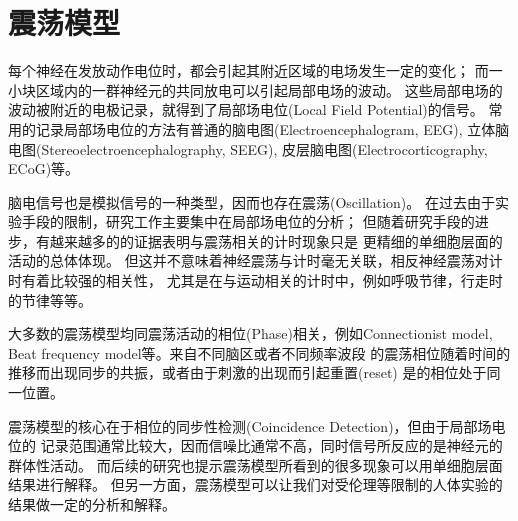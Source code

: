 \section{震荡模型}
每个神经在发放动作电位时，都会引起其附近区域的电场发生一定的变化；
而一小块区域内的一群神经元的共同放电可以引起局部电场的波动。
这些局部电场的波动被附近的电极记录，就得到了局部场电位(Local Field Potential)的信号。
常用的记录局部场电位的方法有普通的脑电图(Electroencephalogram, EEG),
立体脑电图(Stereoelectroencephalography, SEEG), 皮层脑电图(Electrocorticography, ECoG)等。

脑电信号也是模拟信号的一种类型，因而也存在震荡(Oscillation)。
在过去由于实验手段的限制，研究工作主要集中在局部场电位的分析；
但随着研究手段的进步，有越来越多的的证据表明与震荡相关的计时现象只是
更精细的单细胞层面的活动的总体体现\cite{paton2018neural}。
但这并不意味着神经震荡与计时毫无关联，相反神经震荡对计时有着比较强的相关性，
尤其是在与运动相关的计时中，例如呼吸节律，行走时的节律等等\cite{paton2018neural}。

大多数的震荡模型均同震荡活动的相位(Phase)相关，例如Connectionist model,
Beat frequency model等\cite{matell2004cortico}。来自不同脑区或者不同频率波段
的震荡相位随着时间的推移而出现同步的共振，或者由于刺激的出现而引起重置(reset)
是的相位处于同一位置。

震荡模型的核心在于相位的同步性检测(Coincidence Detection)，但由于局部场电位的
记录范围通常比较大，因而信噪比通常不高，同时信号所反应的是神经元的群体性活动。
而后续的研究也提示震荡模型所看到的很多现象可以用单细胞层面结果进行解释。
但另一方面，震荡模型可以让我们对受伦理等限制的人体实验的结果做一定的分析和解释。

